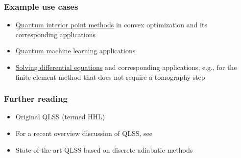 \begin{refsection}

\subsubsection*{Example use cases}

\begin{itemize}
    \item \hyperref[prim:QIPM]{Quantum interior point methods} in convex optimization and its corresponding applications~\cite{kerenidis2018QIntPoint,mohammadisiahroudi2023efficientQLSAinIPMandLP}
    \item \hyperref[appl:ClassicalML]{Quantum machine learning} applications~\cite{wiebe2012QDataFitting,rebentrost2014QSVM}
    \item \hyperref[appl:DiffEq]{Solving differential equations} and corresponding applications, e.g., for the finite element method that does not require a tomography step \cite{montanaro2016quantum}
\end{itemize}


\subsubsection*{Further reading}

\begin{itemize}
    \item Original QLSS (termed HHL) \cite{harrow2009QLinSysSolver}
    \item For a recent overview discussion of QLSS, see \cite{an2022QLSStimeDepAdiabatic}
    \item State-of-the-art QLSS based on discrete adiabatic methods \cite{costa2021OptimalLinearSystem}
\end{itemize}
\printbibliography[heading=secbib,segment=\therefsegment]

\end{refsection}
